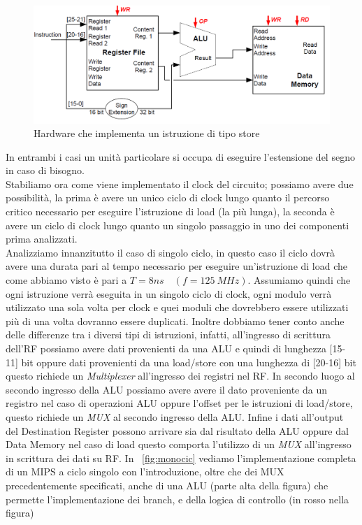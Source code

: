 \begin{figure}[htb]
\centering
\includegraphics[scale=0.45]{img/storehw.png}
\caption{Hardware che implementa un istruzione di tipo store}\label{fig:storehw}
\end{figure}
In entrambi i casi un unità particolare si occupa di eseguire l'estensione del segno in caso di bisogno.\\
Stabiliamo ora come viene implementato il clock del circuito; possiamo avere due possibilità, la prima è avere un unico ciclo di clock lungo quanto il percorso critico necessario per eseguire l'istruzione di load (la più lunga), la seconda è avere un ciclo di clock lungo quanto un singolo passaggio in uno dei componenti prima analizzati.\\
Analizziamo innanzitutto il caso di singolo ciclo, in questo caso il ciclo dovrà avere una durata pari al tempo necessario per eseguire un'istruzione di load che come abbiamo visto è pari a $T = 8 ns \quad (f=125 \ MHz)$. Assumiamo quindi che ogni istruzione verrà eseguita in un singolo ciclo di clock, ogni modulo verrà utilizzato una sola volta per clock e quei moduli che dovrebbero essere utilizzati più di una volta dovranno essere duplicati.
Inoltre dobbiamo tener conto anche delle differenze tra i diversi tipi di istruzioni, infatti, all'ingresso di scrittura dell'RF possiamo avere dati provenienti da una ALU e quindi di lunghezza [15-11] bit oppure dati provenienti da una load/store con una lunghezza di [20-16] bit questo richiede un \emph{Multiplexer} all'ingresso dei registri nel RF. In secondo luogo al secondo ingresso della ALU possiamo avere avere il dato proveniente da un registro nel caso di operazioni ALU oppure l'offset per le istruzioni di load/store, questo richiede un \emph{MUX} al secondo ingresso della ALU. Infine i dati all'output del Destination Register possono arrivare sia dal risultato della ALU oppure dal Data Memory nel caso di load questo comporta l'utilizzo di un \emph{MUX} all'ingresso in scrittura dei dati su RF.
In \figurename~\ref{fig:monocic} vediamo l'implementazione completa di un MIPS a ciclo singolo con l'introduzione, oltre che dei MUX precedentemente specificati, anche di una ALU (parte alta della figura) che permette l'implementazione dei branch, e della logica di controllo (in rosso nella figura)\\
